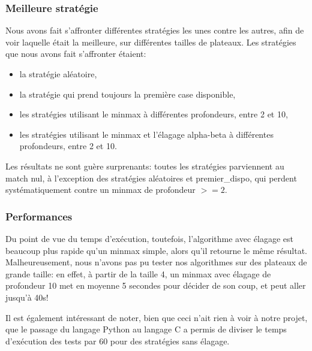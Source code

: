 \subsubsection{Meilleure stratégie}
Nous avons fait s'affronter différentes stratégies les unes contre les
autres, afin de voir laquelle était la meilleure, sur différentes
tailles de plateaux. Les stratégies que nous avons fait s'affronter
étaient:
\begin{itemize}
  \item la stratégie aléatoire,
  \item la stratégie qui prend toujours la première case disponible,
  \item les stratégies utilisant le minmax à différentes profondeurs,
    entre 2 et 10,
  \item les stratégies utilisant le minmax et l'élagage alpha-beta à
    différentes profondeurs, entre 2 et 10.
\end{itemize}
Les résultats ne sont guère surprenants: toutes les stratégies
parviennent au match nul, à l'exception des stratégies aléatoires et
premier\_dispo, qui perdent systématiquement contre un minmax de
profondeur $>= 2$.

\subsubsection{Performances}
Du point de vue du temps d'exécution, toutefois, l'algorithme avec
élagage est beaucoup plus rapide qu'un minmax simple, alors qu'il
retourne le même résultat.
Malheureusement, nous n'avons pas pu tester nos algorithmes sur des
plateaux de grande taille: en effet, à partir de la taille 4, un
minmax avec élagage de profondeur 10 met en moyenne 5 secondes pour
décider de son coup, et peut aller jusqu'à 40s!

Il est également intéressant de noter, bien que ceci n'ait rien à voir
à notre projet, que le passage du langage Python au langage C a permis
de diviser le temps d'exécution des tests par 60 pour des stratégies
sans élagage.
